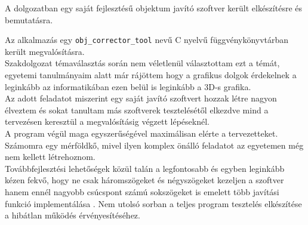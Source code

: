 A dolgozatban egy saját fejlesztésű objektum javító szoftver került elkészítésre és bemutatásra.

Az alkalmazás egy \texttt{obj\_corrector\_tool} nevű C nyelvű függvénykönyvtárban került megvalósításra.\\

Szakdolgozat témaválasztás során nem véletlenül választottam ezt a témát, egyetemi tanulmányaim alatt már rájöttem hogy a grafikus dolgok érdekelnek a leginkább az informatikában ezen belül is leginkább a 3D-s grafika.\\

Az adott feladatot miszerint egy saját javító szoftvert hozzak létre nagyon élveztem és sokat tanultam más szoftverek tesztelésétől elkezdve mind a tervezésen keresztül a megvalósításig végzett lépéseknél.\\

A program végül maga egyszerűségével maximálisan elérte a tervezetteket. Számomra egy mérföldkő, mivel ilyen komplex önálló feladatot az egyetemen még nem kellett létrehoznom.\\

Továbbfejlesztési lehetőségek közül talán a legfontosabb és egyben leginkább kézen fekvő, hogy ne csak háromszögeket és négyszögeket kezeljen a szoftver hanem ennél nagyobb csúcspont számú sokszögeket is emelett több javítási funkció implementálása . Nem utolsó sorban a teljes program tesztelés elkészítése a hibátlan működés érvényesítéséhez.
